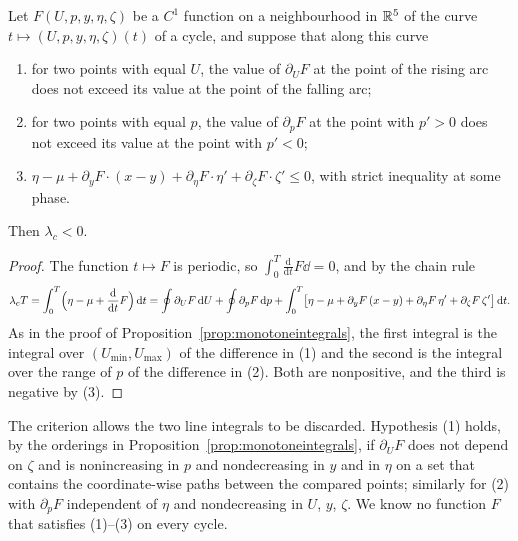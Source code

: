 \begin{corollary}\label{gau:convexcriterion}
Let $F(U,p,y,\eta,\zeta)$ be a $C^1$ function on a neighbourhood in $\mathbb R^5$ of the curve $t\mapsto(U,p,y,\eta,\zeta)(t)$ of a cycle, and suppose that along this curve
\begin{enumerate}[label=(\arabic*)]
\item for two points with equal $U$, the value of $\partial_UF$ at the point of the rising arc does not exceed its value at the point of the falling arc;
\item for two points with equal $p$, the value of $\partial_pF$ at the point with $p'>0$ does not exceed its value at the point with $p'<0$;
\item $\eta-\mu+\partial_yF\cdot(x-y)+\partial_\eta F\cdot\eta'+\partial_\zeta F\cdot\zeta'\le0$, with strict inequality at some phase.
\end{enumerate}
Then $\lambda_c<0$.
\end{corollary}
\begin{proof}
The function $t\mapsto F$ is periodic, so $\int_0^T\frac{\mathrm d}{\mathrm dt}F\dd=0$, and by the chain rule
\[
\lambda_cT=\int_0^T\Bigl(\eta-\mu+\frac{\mathrm d}{\mathrm dt}F\Bigr)\,\mathrm dt=\oint\partial_UF\,\mathrm dU+\oint\partial_pF\,\mathrm dp+\int_0^T\bigl[\eta-\mu+\partial_yF\,(x-y)+\partial_\eta F\,\eta'+\partial_\zeta F\,\zeta'\bigr]\,\mathrm dt .
\]
As in the proof of Proposition~\ref{prop:monotoneintegrals}, the first integral is the integral over $(U_{\min},U_{\max})$ of the difference in (1) and the second is the integral over the range of $p$ of the difference in (2). Both are nonpositive, and the third is negative by (3).
\end{proof}
The criterion allows the two line integrals to be discarded. Hypothesis (1) holds, by the orderings in Proposition~\ref{prop:monotoneintegrals}, if $\partial_UF$ does not depend on $\zeta$ and is nonincreasing in $p$ and nondecreasing in $y$ and in $\eta$ on a set that contains the coordinate-wise paths between the compared points; similarly for (2) with $\partial_pF$ independent of $\eta$ and nondecreasing in $U$, $y$, $\zeta$. We know no function $F$ that satisfies (1)--(3) on every cycle.

